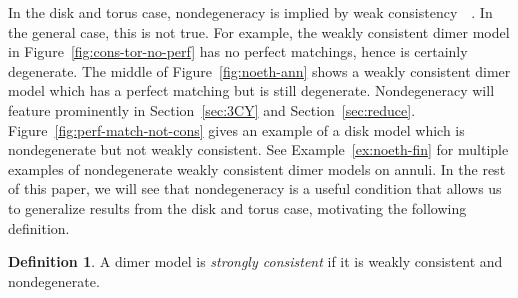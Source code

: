 \documentclass{article}
\theoremstyle{definition}
\newtheorem{defn}[thm]{Definition}
\begin{document}
In the disk and torus case, nondegeneracy is implied by weak consistency~\cite[Proposition 6.2]{XIUM}~\cite{CKP}. In the general case, this is not true.
For example, the weakly consistent dimer model in Figure~\ref{fig:cons-tor-no-perf} has no perfect matchings, hence is certainly degenerate. The middle of Figure~\ref{fig:noeth-ann} shows a weakly consistent dimer model which has a perfect matching but is still degenerate. Nondegeneracy will feature prominently in Section~\ref{sec:3CY} and Section~\ref{sec:reduce}. 
Figure~\ref{fig:perf-match-not-cons} gives an example of a disk model which is nondegenerate but not weakly consistent.
See Example~\ref{ex:noeth-fin} for multiple examples of nondegenerate weakly consistent dimer models on annuli.
In the rest of this paper, we will see that nondegeneracy is a useful condition that allows us to generalize results from the disk and torus case, motivating the following definition.

\begin{defn}
	A dimer model is \textit{strongly consistent} if it is weakly consistent and nondegenerate.
\end{defn}
\end{document}

